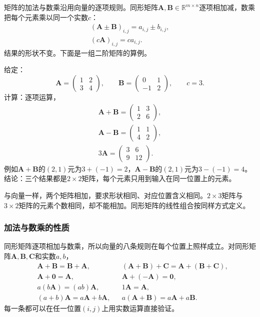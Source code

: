 矩阵的加法与数乘沿用向量的逐项规则。同形矩阵$\bm A,\bm B\in\mathbb R^{m\times n}$逐项相加减，数乘把每个元素乘以同一个实数$c$：
\[
 \begin{gathered}
(\bm A\pm\bm B)_{i,j}=a_{i,j}\pm b_{i,j},\\
(c\bm A)_{i,j}=ca_{i,j}.
 \end{gathered}
\]
结果的形状不变。下面是一组二阶矩阵的算例。
\begin{example}
\label{ex:ls-matrix-addition-scaling}
给定：
\[
\bm A=\begin{pmatrix}1&2\\3&4\end{pmatrix},\qquad
\bm B=\begin{pmatrix}0&1\\-1&2\end{pmatrix},\qquad
c=3.
\]
计算：逐项运算，
\[
\begin{gathered}
\bm A+\bm B=\begin{pmatrix}1&3\\2&6\end{pmatrix},\\
\bm A-\bm B=\begin{pmatrix}1&1\\4&2\end{pmatrix},\\
3\bm A=\begin{pmatrix}3&6\\9&12\end{pmatrix}.
\end{gathered}
\]
例如$\bm A+\bm B$的$(2,1)$元为$3+(-1)=2$，$\bm A-\bm B$的$(2,1)$元为$3-(-1)=4$。
结论：三个结果都是$2\times2$矩阵，每个元素只用到输入在同一位置上的元素。
\end{example}
与向量一样，两个矩阵相加，要求形状相同、对应位置含义相同。$2\times3$矩阵与$3\times2$矩阵的元素个数相同，却不能相加。同形矩阵的线性组合按同样方式定义。

\subsubsection{加法与数乘的性质}
同形矩阵逐项相加与数乘，所以向量的八条规则在每个位置上照样成立。对同形矩阵$\bm A,\bm B,\bm C$和实数$a,b$，
\[
\begin{aligned}
 &\bm A+\bm B=\bm B+\bm A, && (\bm A+\bm B)+\bm C=\bm A+(\bm B+\bm C),\\
 &\bm A+\bm0=\bm A, && \bm A+(-\bm A)=\bm0,\\
 &a(b\bm A)=(ab)\bm A, && 1\bm A=\bm A,\\
 &(a+b)\bm A=a\bm A+b\bm A, && a(\bm A+\bm B)=a\bm A+a\bm B.
\end{aligned}
\]
每一条都可以在任一位置$(i,j)$上用实数运算直接验证。


